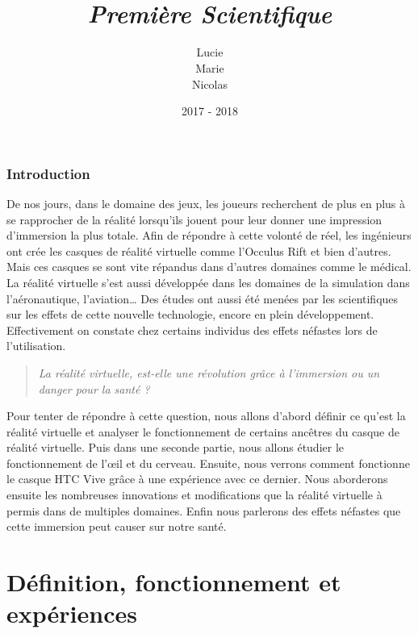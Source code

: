 \documentclass[12pt, a4paper]{report}
\title{
\sc{\bf{{\LARGE Travaux~$\cdot$~Personnels $\cdot$~Encadrés}}}\\
\vspace{1cm}
{\itshape{\Large Première Scientifique}} \\
\vspace{1cm}
\ovalbox{\parbox[c][2.5cm][c]{0.65\textwidth}{
\begin{center}
\sc{\bf{\Large - L'insolite -\\}}
\sc{\bf{\Large La réalité virtuelle}}
\end{center}}}}
\author{
Lucie \sc{Chevallereau}
\\
Marie \sc{Bagrel}
\\
Nicolas \sc{Gobillard}
\\
\sc{ps1}
}
\date{\sc{Année} 2017 - 2018}
\begin{document}
\pagestyle{fancy}

\vfill
\maketitle{}
\vfill

\newpage{}
\tableofcontents{}

\newpage{}

\section*{Introduction}

De nos jours, dans le domaine des jeux, les joueurs recherchent de plus en plus à se rapprocher de la réalité lorsqu'ils jouent pour leur donner une impression d'immersion la plus totale. Afin de répondre à cette volonté de réel, les ingénieurs ont crée les casques de réalité virtuelle comme l'Occulus Rift et bien d'autres.
Mais ces casques se sont vite répandus dans d'autres domaines comme le médical. La réalité virtuelle s'est aussi développée dans les domaines de la simulation dans l'aéronautique, l'aviation\ldots{}
Des études ont aussi été menées par les scientifiques sur les effets de cette nouvelle technologie, encore en plein développement.
Effectivement on constate chez certains individus des effets néfastes lors de l'utilisation.

\begin{quotation}\noindent\itshape
La réalité virtuelle, est-elle une révolution grâce à l'immersion ou un danger pour la santé ?
\end{quotation}


Pour tenter de répondre à cette question, nous allons d'abord définir ce qu'est la réalité virtuelle et analyser le fonctionnement de certains ancêtres du casque de réalité virtuelle. Puis dans une seconde partie, nous allons étudier le fonctionnement de l'\oe{}il et du cerveau. Ensuite, nous verrons comment fonctionne le casque HTC Vive  grâce à une expérience avec ce dernier. Nous aborderons ensuite les nombreuses innovations et modifications que la réalité virtuelle à permis dans de multiples domaines. Enfin nous parlerons des effets néfastes que cette immersion peut causer sur notre santé.


\part{Définition, fonctionnement et expériences}
\end{document}

